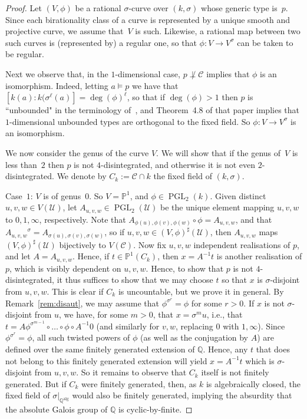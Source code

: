 \documentclass[\DocOpts]{amsart}
\theoremstyle{definition}
\def\alg{{\operatorname{alg}}}
\def\pgl{\operatorname{PGL}}
\def\C{\mathcal{C}}
\def\U{\mathcal{U}}
\def\PP{{\mathbb{P}}}
\def\QQ{\mathbb{Q}}
\newcommand{\kk}{k}
\newcommand{\shp}[1]{{#1}^\sharp}
\newcommand{\<}{\langle}
\renewcommand{\>}{\rangle}
\newcommand{\pp}[1]{(#1)}
\begin{document}
\begin{proof}
Let $(V,\phi)$ be a rational $\sigma$-curve over $(k,\sigma)$ whose generic type is~$p$.
Since each birationality class of a curve is represented by a unique smooth 
and projective curve, we assume that~\(V\) is such.
Likewise, a rational map 
between two such curves is (represented by) a regular one, so that $\phi:V\to V^\sigma$ can be taken to be regular.

Next we observe that, in the $1$-dimensional case, $p\not\perp\C$ implies that $\phi$ is an isomorphism.
Indeed, letting \(a\models p\) we have that
$[k(a):k(\sigma^\ell(a)]=\deg(\phi)^\ell$, so that if $\deg(\phi)>1$ then $p$ is ``unbounded" in the terminology of~\cite{acfa}, and Theorem~4.8 of that paper implies that $1$-dimensional unbounded types are orthogonal to the fixed field.
So $\phi:V\to V^\sigma$ is an isomorphism.

We now consider the genus of the curve $V$.
We will show that if the genus of~\(V\) is less than~\(2\) then 
	\(p\) is not \(4\)-disintegrated, and otherwise it is not even \(2\)-disintegrated.
	We denote by $C_k:=\C\cap k$ the fixed field of $(k,\sigma)$.

Case~$1$: $V$ is of genus~$0$.
So \(V=\PP^1\), and \(\phi\in\pgl_2(\kk)\). Given 
		distinct \(u,v,w\in{}V(\U)\), let \(A_{u,v,w}\in\pgl_2(\U)\) be the 
		unique element mapping \(u,v,w\) to \(0,1,\infty\), respectively. Note 
		that \(A_{\phi(u),\phi(v),\phi(w)}\circ\phi=A_{u,v,w}\), and that 
		\({A_{u,v,w}}^\sigma=A_{\sigma(u),\sigma(v),\sigma(w)}\), so if 
		\(u,v,w\in\shp{\pp{V,\phi}}(\U)\), then \(A_{u,v,w}\) maps 
		\(\shp{\pp{V,\phi}}(\U)\) bijectively to \(V(\C)\).
		Now fix \(u,v,w\) independent realisations of \(p\), and let
		\(A=A_{u,v,w}\).
		Hence, if \(t\in\PP^1(C_\kk)\), then \(x=A^{-1}t\) is another 
		realisation of \(p\), which is visibly dependent on \(u,v,w\).
		Hence, to show that \(p\) is not \(4\)-disintegrated, it thus suffices to show 
		that we may choose \(t\) so that \(x\) is \(\sigma\)-disjoint from 
		\(u,v,w\).
		This is clear if \(C_\kk\) is uncountable, but we prove it in general. 
		By 
		Remark~\ref{rem:disaut}, we may assume that \(\phi^{\sigma^r}=\phi\) for some \(r>0\).  
		If \(x\) is not \(\sigma\)-disjoint from \(u\), we have, for some 
		\(m>0\), that \(x=\sigma^mu\), i.e., that   
		\(t=A\phi^{\sigma^{m-1}}\circ\dots\circ\phi\circ{}A^{-1}0\) (and 
		similarly for \(v,w\), replacing \(0\) with \(1,\infty\)).  Since 
		\(\phi^{\sigma^r}=\phi\), all such twisted powers of \(\phi\) (as well as 
		the conjugation by \(A\)) are defined over the same finitely generated 
		extension of \(\QQ\). Hence, any \(t\) that does not belong to this 
		finitely generated extension will yield \(x=A^{-1}t\) which is  
		\(\sigma\)-disjoint from \(u,v,w\).
		So it remains to observe that 
		\(C_\kk\) itself is not finitely generated.
		But if \(C_\kk\) were finitely generated, then, as $k$ is algebraically closed, the fixed field of \(\sigma|_{\QQ^{\alg}}\) would also be finitely generated, implying the absurdity that the absolute Galois group of 
	 \(\QQ\) is cyclic-by-finite.


\end{proof}
\end{document}
